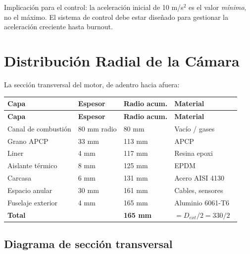 \documentclass[11pt, a4paper]{article}
\newcommand{\cmark}{\textcolor{tlvgreen}{\textbf{\checkmark}}}
\begin{document}
Implicaci\'{o}n para el control: la aceleraci\'{o}n inicial de 10 m/s$^2$ es el valor \textit{m\'{i}nimo}, no el m\'{a}ximo. El sistema de control debe estar dise\~{n}ado para gestionar la aceleraci\'{o}n creciente hasta burnout.

\section{Distribuci\'{o}n Radial de la C\'{a}mara}

La secci\'{o}n transversal del motor, de adentro hacia afuera:

\begin{longtable}{L{3.5cm} C{2cm} C{2.5cm} L{5.5cm}}
  \color{white}\textbf{Capa} &
  \color{white}\textbf{Espesor} &
  \color{white}\textbf{Radio acum.} &
  \color{white}\textbf{Material} \\
  \endfirsthead
  \color{white}\textbf{Capa} &
  \color{white}\textbf{Espesor} &
  \color{white}\textbf{Radio acum.} &
  \color{white}\textbf{Material} \\
  \endhead
  Canal de combusti\'{o}n & 80 mm radio & 80 mm   & Vac\'{i}o / gases \\
  Grano APCP              & 33 mm       & 113 mm  & APCP \\
  Liner                   & 4 mm        & 117 mm  & Resina epoxi \\
  Aislante t\'{e}rmico    & 8 mm        & 125 mm  & EPDM \\
  Carcasa                 & 6 mm        & 131 mm  & Acero AISI 4130 \\
  Espacio anular          & 30 mm       & 161 mm  & Cables, sensores \\
  Fuselaje exterior       & 4 mm        & 165 mm  & Aluminio 6061-T6 \\
  \textbf{Total}          &             & \textbf{165 mm} & $= D_{ext}/2 = 330/2$\ \cmark \\
\end{longtable}

\subsection{Diagrama de secci\'{o}n transversal}
\end{document}
